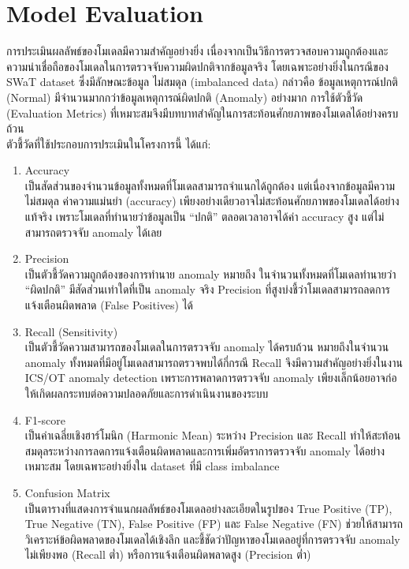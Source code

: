 \section{Model Evaluation}
การประเมินผลลัพธ์ของโมเดลมีความสำคัญอย่างยิ่ง เนื่องจากเป็นวิธีการตรวจสอบความถูกต้องและความน่าเชื่อถือของโมเดลในการตรวจจับความผิดปกติจากข้อมูลจริง โดยเฉพาะอย่างยิ่งในกรณีของ SWaT dataset ซึ่งมีลักษณะข้อมูล ไม่สมดุล (imbalanced data) กล่าวคือ ข้อมูลเหตุการณ์ปกติ (Normal) มีจำนวนมากกว่าข้อมูลเหตุการณ์ผิดปกติ (Anomaly) อย่างมาก การใช้ตัวชี้วัด (Evaluation Metrics) ที่เหมาะสมจึงมีบทบาทสำคัญในการสะท้อนศักยภาพของโมเดลได้อย่างครบถ้วน
\\ ตัวชี้วัดที่ใช้ประกอบการประเมินในโครงการนี้ ได้แก่:
\begin{enumerate}
\item Accuracy \\ เป็นสัดส่วนของจำนวนข้อมูลทั้งหมดที่โมเดลสามารถจำแนกได้ถูกต้อง แต่เนื่องจากข้อมูลมีความ \\ ไม่สมดุล ค่าความแม่นยำ (accuracy) เพียงอย่างเดียวอาจไม่สะท้อนศักยภาพของโมเดลได้อย่างแท้จริง เพราะโมเดลที่ทำนายว่าข้อมูลเป็น “ปกติ” ตลอดเวลาอาจได้ค่า accuracy สูง แต่ไม่สามารถตรวจจับ anomaly ได้เลย
\item Precision \\ เป็นตัวชี้วัดความถูกต้องของการทำนาย anomaly หมายถึง ในจำนวนทั้งหมดที่โมเดลทำนายว่า “ผิดปกติ” มีสัดส่วนเท่าใดที่เป็น anomaly จริง Precision ที่สูงบ่งชี้ว่าโมเดลสามารถลดการแจ้งเตือนผิดพลาด (False Positives) ได้
\item Recall (Sensitivity) \\ เป็นตัวชี้วัดความสามารถของโมเดลในการตรวจจับ anomaly ได้ครบถ้วน หมายถึงในจำนวน \\ anomaly ทั้งหมดที่มีอยู่โมเดลสามารถตรวจพบได้กี่กรณี Recall จึงมีความสำคัญอย่างยิ่งในงาน ICS/OT anomaly detection เพราะการพลาดการตรวจจับ anomaly เพียงเล็กน้อยอาจก่อให้เกิดผลกระทบต่อความปลอดภัยและการดำเนินงานของระบบ
\item F1-score \\ เป็นค่าเฉลี่ยเชิงฮาร์โมนิก (Harmonic Mean) ระหว่าง Precision และ Recall ทำให้สะท้อนสมดุลระหว่างการลดการแจ้งเตือนผิดพลาดและการเพิ่มอัตราการตรวจจับ anomaly ได้อย่างเหมาะสม โดยเฉพาะอย่างยิ่งใน dataset ที่มี class imbalance
\item Confusion Matrix \\ เป็นตารางที่แสดงการจำแนกผลลัพธ์ของโมเดลอย่างละเอียดในรูปของ True Positive (TP), True Negative (TN), False Positive (FP) และ False Negative (FN) ช่วยให้สามารถวิเคราะห์ข้อผิดพลาดของโมเดลได้เชิงลึก และชี้ชัดว่าปัญหาของโมเดลอยู่ที่การตรวจจับ anomaly ไม่เพียงพอ (Recall ต่ำ) หรือการแจ้งเตือนผิดพลาดสูง (Precision ต่ำ)

\end{enumerate}
